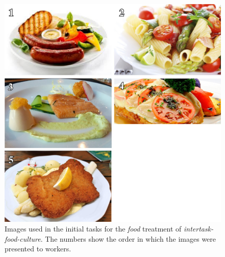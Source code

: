 \documentclass{sigchi}
\begin{document}
\begin{figure}
	\begin{center}
	\includegraphics{figs/task2-food.jpg}
	\end{center}
	\caption{
		Images used in the initial tasks for the
		\textit{food} treatment of \textit{intertask-food-culture}.  
		The numbers show the order in which the 
		images were presented to workers.
	}
	\label{fig:task2:food}
\end{figure}
\end{document}
